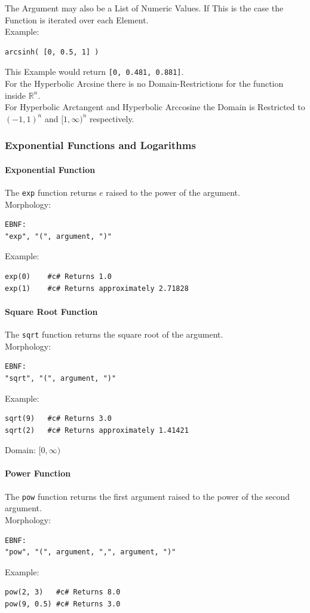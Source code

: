 \documentclass{report}
\begin{document}
The Argument may also be a List of Numeric Values. If This is the case the Function is iterated over each Element.\\
Example:
\begin{verbatim}
arcsinh( [0, 0.5, 1] )
\end{verbatim}
This Example would return \texttt{[0, 0.481, 0.881]}.\\
For the Hyperbolic Arcsine there is no Domain-Restrictions for the function inside $\mathbb{R}^n$. \\
For Hyperbolic Arctangent and Hyperbolic Arccosine the Domain is Restricted to $(-1,1)^n$ and $[1,\infty)^n$ respectively.\\

\subsubsection{Exponential Functions and Logarithms}
\paragraph{Exponential Function}
The \texttt{exp} function returns $e$ raised to the power of the argument. \\
Morphology:
\begin{verbatim}
EBNF:
"exp", "(", argument, ")"
\end{verbatim}
Example:
\begin{verbatim}
exp(0)    #c# Returns 1.0
exp(1)    #c# Returns approximately 2.71828
\end{verbatim}

\paragraph{Square Root Function}
The \texttt{sqrt} function returns the square root of the argument. \\
Morphology:
\begin{verbatim}
EBNF:
"sqrt", "(", argument, ")"
\end{verbatim}
Example:
\begin{verbatim}
sqrt(9)   #c# Returns 3.0
sqrt(2)   #c# Returns approximately 1.41421
\end{verbatim}
Domain: $[0, \infty)$

\paragraph{Power Function}
The \texttt{pow} function returns the first argument raised to the power of the second argument. \\
Morphology:
\begin{verbatim}
EBNF:
"pow", "(", argument, ",", argument, ")"
\end{verbatim}
Example:
\begin{verbatim}
pow(2, 3)   #c# Returns 8.0
pow(9, 0.5) #c# Returns 3.0
\end{verbatim}
\end{document}
